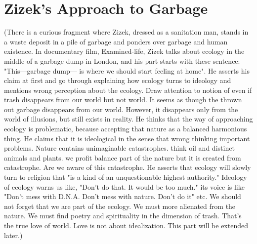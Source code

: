  


\section{Zizek's Approach to Garbage}
(There is a curious fragment where Zizek, dressed as a sanitation man, stands in a waste deposit in a pile of garbage and ponders over garbage and human existence. In documentary film, Examined-life, Zizek talks about ecology in the middle of a garbage dump in London, and his part starts with these sentence: "This---garbage dump--- is where we should start feeling at home". He asserts his claim at first and go through explaining how ecology turns to ideology and mentions wrong perception about the ecology. Draw attention to notion of even if trash disappears from our world but not world. It seems as though the thrown out garbage disappears from our world. However, it disappears only from the world of illusions, but still exists in reality. He thinks that the way of approaching ecology is problematic, because accepting that nature as a balanced harmonious thing. He claims that it is ideological in the sense that wrong thinking important problems. Nature contains unimaginable catastrophes. think oil and distinct animals and plants. we profit balance part of the nature but it is created from catastrophe. Are we aware of this catastrophe. He asserts that ecology will slowly turn to religion that "is a kind of an unquestionable highest authority." Ideology of ecology warns us like, "Don't do that. It would be too much." its voice is like "Don't mess with D.N.A. Don't mess with nature. Don't do it" etc. We should not forget that we are part of the ecology. We must more alienated from the nature. We must find poetry and spirituality in the dimension of trash. That's the true love of world. Love is not about idealization. This part will be extended later.)

